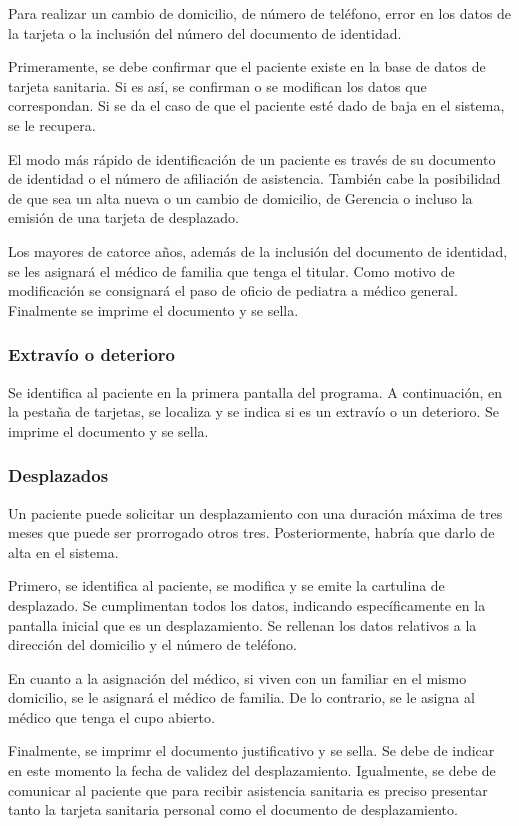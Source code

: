 Para realizar un cambio de domicilio, de número de teléfono, error en los datos de la tarjeta o la inclusión del número del documento de identidad.

Primeramente, se debe confirmar que el paciente existe en la base de datos de tarjeta sanitaria.
Si es así, se confirman o se modifican los datos que correspondan.
Si se da el caso de que el paciente esté dado de baja en el sistema, se le recupera.

El modo más rápido de identificación de un paciente es través de su documento de identidad o el número de afiliación de asistencia.
También cabe la posibilidad de que sea un alta nueva o un cambio de domicilio, de Gerencia o incluso la emisión de una tarjeta de desplazado.

Los mayores de catorce años, además de la inclusión del documento de identidad, se les asignará el médico de familia que tenga el titular. Como motivo de modificación se consignará el paso de oficio de pediatra a médico general.
Finalmente se imprime el documento y se sella.

\subsubsection{Extravío o deterioro}

Se identifica al paciente en la primera pantalla del programa.
A continuación, en la pestaña de tarjetas, se localiza y se indica si es un extravío o un deterioro.
Se imprime el documento y se sella.

\subsubsection{Desplazados}

Un paciente puede solicitar un desplazamiento con una duración máxima de tres meses que puede ser prorrogado otros tres.
Posteriormente, habría que darlo de alta en el sistema.

Primero, se identifica al paciente, se modifica y se emite la cartulina de desplazado.
Se cumplimentan todos los datos, indicando específicamente en la pantalla inicial que es un desplazamiento.
Se rellenan los datos relativos a la dirección del domicilio y el número de teléfono.

En cuanto a la asignación del médico, si viven con un familiar en el mismo domicilio, se le asignará el médico de familia.
De lo contrario, se le asigna al médico que tenga el cupo abierto.

Finalmente, se imprimr el documento justificativo y se sella.
Se debe de indicar en este momento la fecha de validez del desplazamiento.
Igualmente, se debe de comunicar al paciente que para recibir asistencia sanitaria es preciso presentar tanto la tarjeta sanitaria personal como el documento de desplazamiento.

